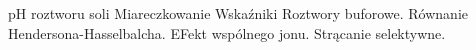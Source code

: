 pH roztworu soli
Miareczkowanie
Wskaźniki
Roztwory buforowe.
Równanie Hendersona-Hasselbalcha.
EFekt wspólnego jonu.
Strącanie selektywne.